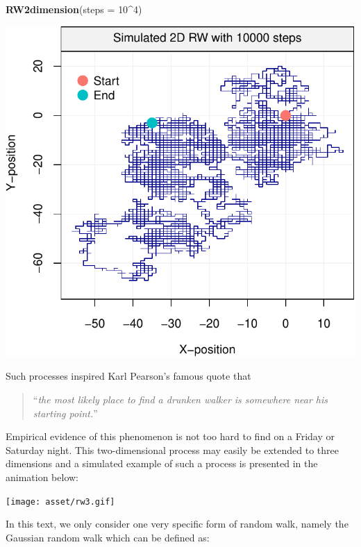 \documentclass[]{book}
\newenvironment{Shaded}{\begin{snugshade}}{\end{snugshade}}
\newcommand{\KeywordTok}[1]{\textcolor[rgb]{0.13,0.29,0.53}{\textbf{#1}}}
\newcommand{\DataTypeTok}[1]{\textcolor[rgb]{0.13,0.29,0.53}{#1}}
\newcommand{\DecValTok}[1]{\textcolor[rgb]{0.00,0.00,0.81}{#1}}
\newcommand{\OperatorTok}[1]{\textcolor[rgb]{0.81,0.36,0.00}{\textbf{#1}}}
\newcommand{\NormalTok}[1]{#1}
\theoremstyle{definition}
\theoremstyle{definition}
\theoremstyle{definition}
\theoremstyle{remark}
\begin{document}
\begin{Shaded}
\begin{Highlighting}[]
\KeywordTok{RW2dimension}\NormalTok{(}\DataTypeTok{steps =} \DecValTok{10}\OperatorTok{^}\DecValTok{4}\NormalTok{)}
\end{Highlighting}
\end{Shaded}

\begin{center}\includegraphics{ts_files/figure-latex/RW2d-2} \end{center}

Such processes inspired Karl Pearson's famous quote that

\begin{quote}
``\emph{the most likely place to find a drunken walker is somewhere near
his starting point.}''
\end{quote}

Empirical evidence of this phenomenon is not too hard to find on a
Friday or Saturday night. This two-dimensional process may easily be
extended to three dimensions and a simulated example of such a process
is presented in the animation below:

\texttt{[image: asset/rw3.gif]}

In this text, we only consider one very specific form of random walk,
namely the Gaussian random walk which can be defined as:
\end{document}

